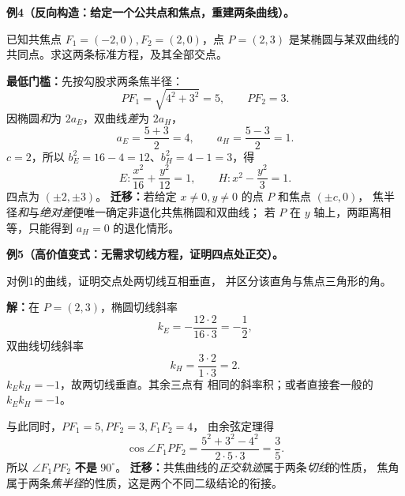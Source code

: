 \clearpage
\begin{examplebox}
\textbf{例4（反向构造：给定一个公共点和焦点，重建两条曲线）。}

已知共焦点 $F_1=(-2,0),F_2=(2,0)$，点 $P=(2,3)$
是某椭圆与某双曲线的共同点。求这两条标准方程，及其全部交点。

\textbf{最低门槛：}先按勾股求两条焦半径：
\[
PF_1=\sqrt{4^2+3^2}=5,\qquad PF_2=3.
\]
因椭圆\emph{和}为 $2a_E$，双曲线\emph{差}为 $2a_H$，
\[
a_E=\frac{5+3}{2}=4,\qquad a_H=\frac{5-3}{2}=1.
\]
$c=2$，所以 $b_E^2=16-4=12$、$b_H^2=4-1=3$，得
\[
\boxed{E:\frac{x^2}{16}+\frac{y^2}{12}=1},\qquad
\boxed{H:x^2-\frac{y^2}{3}=1}.
\]
四点为 $(\pm2,\pm3)$。
\textbf{迁移：}若给定 $x\ne0,y\ne0$ 的点 $P$ 和焦点 $(\pm c,0)$，
焦半径\emph{和}与\emph{绝对差}便唯一确定非退化共焦椭圆和双曲线；
若 $P$ 在 $y$ 轴上，两距离相等，只能得到 $a_H=0$ 的退化情形。
\end{examplebox}

\clearpage
\begin{examplebox}
\textbf{例5（高价值变式：无需求切线方程，证明四点处正交）。}

对例1的曲线，证明交点处两切线互相垂直，
并区分该直角与焦点三角形的角。

\textbf{解：}在 $P=(2,3)$，椭圆切线斜率
\[
k_E=-\frac{12\cdot2}{16\cdot3}=-\frac12,
\]
双曲线切线斜率
\[
k_H=\frac{3\cdot2}{1\cdot3}=2.
\]
$k_Ek_H=-1$，故两切线垂直。其余三点有
相同的斜率积；或者直接套一般的 $k_Ek_H=-1$。

与此同时，$PF_1=5,PF_2=3,F_1F_2=4$，
由余弦定理得
\[
\cos\angle F_1PF_2=\frac{5^2+3^2-4^2}{2\cdot5\cdot3}=\frac35.
\]
所以 $\angle F_1PF_2$ \textbf{不是} $90^\circ$。
\textbf{迁移：}共焦曲线的\emph{正交轨迹}属于两条\emph{切线}的性质，
焦角属于两条\emph{焦半径}的性质，这是两个不同二级结论的衔接。
\end{examplebox}

